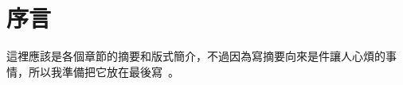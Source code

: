 \chapter{序言} \label{pre}

\begin{kaitext}
這裡應該是各個章節的摘要和版式簡介，不過因為寫摘要向來是件讓人心煩的事情，所以我準備把它放在最後寫~\smiley。

\danger\\\enddanger
\ddanger\\\enddanger
\end{kaitext}